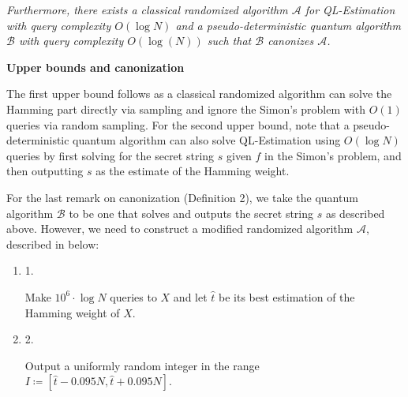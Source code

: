 \documentclass[10pt,a4paper]{article}
\begin{document}
\emph{Furthermore, there exists a classical randomized algorithm $\mathcal{A}$ for QL-Estimation with query complexity $O(\log N)$ and a pseudo-deterministic quantum algorithm $\mathcal{B}$ with query complexity $O(\log(N))$ such that $\mathcal{B}$ canonizes $\mathcal{A}$.}\par







\par\medskip\noindent\textbf{Upper bounds and canonization}\par




The first upper bound follows as a classical randomized algorithm can solve the Hamming part directly via sampling and ignore the Simon’s problem with $O(1)$ queries via random sampling. For the second upper bound, note that a pseudo-deterministic quantum algorithm can also solve QL-Estimation using $O(\log N)$ queries by first solving for the secret string $s$ given $f$ in the Simon’s problem, and then outputting ${s}$ as the estimate of the Hamming weight.\par




For the last remark on canonization (Definition 2), we take the quantum algorithm $\mathcal{B}$ to be one that solves and outputs the secret string $s$ as described above.
However, we need to construct a modified randomized algorithm $\mathcal{A}$, described in below:\par


\begin{enumerate}


\item[] 
1. 


Make $10^{6}\cdot\log N$ queries to $X$ and let $\hat{t}$ be its best estimation of the Hamming weight of $X$.\par





\item[] 
2. 


Output a uniformly random integer in the range $I\coloneqq[\hat{t}-0.095N,\hat{t}+0.095N]$.\par





\end{enumerate}
\end{document}
